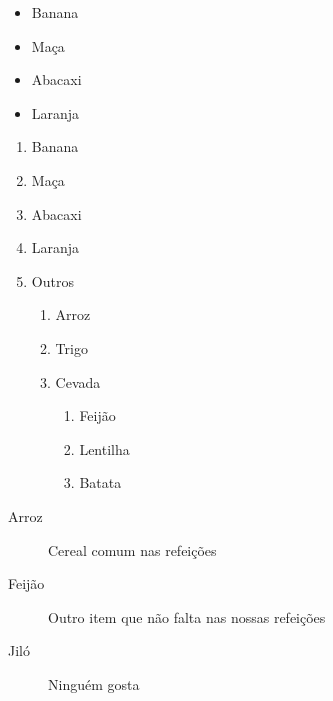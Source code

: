 \documentclass[12pt, a4paper]{article}
\begin{document}
\begin{itemize}
	\item Banana
	\item Maça
	\item Abacaxi
	\item Laranja
\end{itemize}

\begin{enumerate}
	\item Banana
	\item Maça
	\item Abacaxi
	\item Laranja
	\item Outros
	\begin{enumerate}
		\item Arroz
		\item Trigo
		\item Cevada
		\begin{enumerate}
			\item Feijão
			\item Lentilha
			\item Batata
		\end{enumerate}
	\end{enumerate}
\end{enumerate}

\begin{description}
	\item[Arroz] Cereal comum nas refeições
	\item[Feijão] Outro item que não falta nas nossas refeições
	\item[Jiló] Ninguém gosta
\end{description}
\end{document}
